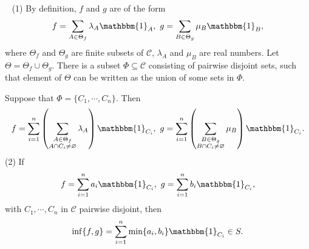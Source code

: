 \begin{proofenv}
    \ \newline
    (1) By definition, $f$ and $g$ are of the form
    $$ f=\sum_{A\in \Theta_f}\lambda_A\mathbbm{1}_{A},\ g=\sum_{B\in \Theta_g} \mu_B\mathbbm{1}_{B},$$
    where $\Theta_f$ and $\Theta_g$ are finite subsets of $\mathcal{C}$, $\lambda_A$ and $\mu_B$ are real numbers. Let $\Theta=\Theta_f\cup \Theta_g$. There is a subset $\Phi\subseteq \mathcal{C}$ consisting of pairwise disjoint sets, such that element of $\Theta$ can be written as the union of some sets in $\Phi$.

    \quad Suppose that $\Phi=\{C_1,\cdots,C_n\}$. Then
    $$ f=\sum_{i=1}^{n}\left(\sum_{\substack{A\in \Theta_f\\ A\cap C_i\neq \varnothing}}\lambda_A\right)\mathbbm{1}_{C_i},\ g=\sum_{i=1}^{n}\left(\sum_{\substack{B\in \Theta_g\\ B\cap C_i\neq \varnothing}}\mu_B\right)\mathbbm{1}_{C_i}.$$
    (2) If
    $$ f=\sum_{i=1}^{n}a_i\mathbbm{1}_{C_i},\ g=\sum_{i=1}^{n}b_i\mathbbm{1}_{C_i},$$
    with $C_1,\cdots,C_n$ in $\mathcal{C}$ pairwise disjoint, then 
    $$\inf\{f,g\}=\sum_{i=1}^{n}\min\{a_i,b_i\}\mathbbm{1}_{C_i}\in S.$$
\end{proofenv}
